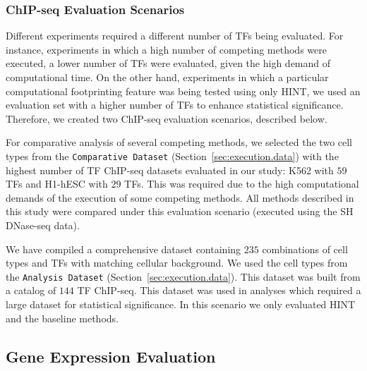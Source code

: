 \subsubsection{ChIP-seq Evaluation Scenarios}

Different experiments required a different number of TFs being evaluated. For instance, experiments in which a high number of competing methods were executed, a lower number of TFs were evaluated, given the high demand of computational time. On the other hand, experiments in which a particular computational footprinting feature was being tested using only HINT, we used an evaluation set with a higher number of TFs to enhance statistical significance. Therefore, we created two ChIP-seq evaluation scenarios, described below.

\vspace{0.3cm}

 For comparative analysis of several competing methods, we selected the two cell types from the {\tt Comparative Dataset} (Section~\ref{sec:execution.data}) with the highest number of TF ChIP-seq datasets evaluated in our study: K562 with $59$ TFs and H1-hESC with $29$ TFs. This was required due to the high computational demands of the execution of some competing methods. All methods described in this study were compared under this evaluation scenario (executed using the SH DNase-seq data).

\vspace{0.2cm}

 We have compiled a comprehensive dataset containing $235$ combinations of cell types and TFs with matching cellular background. We used the cell types from the {\tt Analysis Dataset} (Section~\ref{sec:execution.data}). This dataset was built from a catalog of $144$ TF ChIP-seq. This dataset was used in analyses which required a large dataset for statistical significance. In this scenario we only evaluated HINT and the baseline methods.

\vspace{0.3cm}

\subsection{Gene Expression Evaluation}
\label{sec:gene.expression.evaluation}

